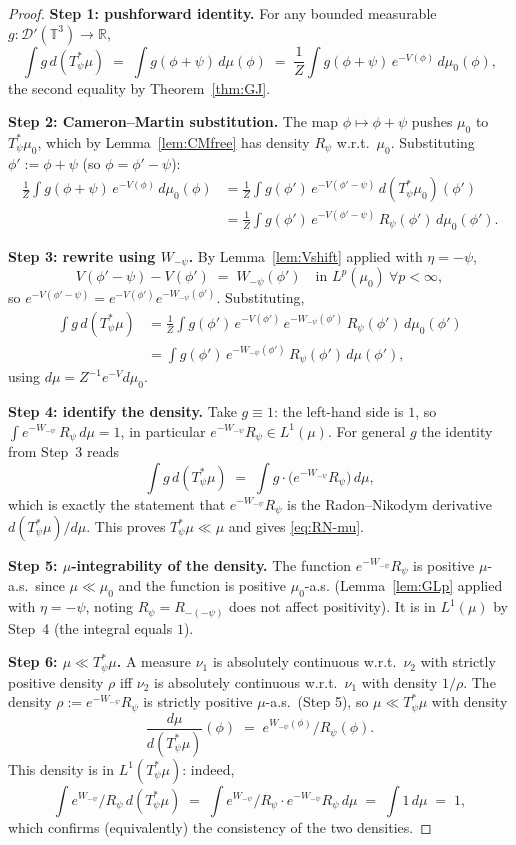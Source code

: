 \documentclass[12pt]{article}
\theoremstyle{definition}
\begin{document}
\begin{proof}
\textbf{Step 1: pushforward identity.}
For any bounded measurable $g:\mathcal{D}'(\mathbb{T}^3)\to\mathbb{R}$,
\[
\int g\,d(T_\psi^*\mu)\;=\;\int g(\phi+\psi)\,d\mu(\phi)
\;=\;\frac{1}{Z}\int g(\phi+\psi)\,e^{-V(\phi)}\,d\mu_0(\phi),
\]
the second equality by Theorem~\ref{thm:GJ}.

\textbf{Step 2: Cameron--Martin substitution.}
The map $\phi\mapsto\phi+\psi$ pushes $\mu_0$ to $T_\psi^*\mu_0$, which by
Lemma~\ref{lem:CMfree} has density $R_\psi$ w.r.t.\ $\mu_0$. Substituting $\phi':=\phi+\psi$
(so $\phi=\phi'-\psi$):
\begin{align*}
\frac{1}{Z}\int g(\phi+\psi)\,e^{-V(\phi)}\,d\mu_0(\phi)
&= \frac{1}{Z}\int g(\phi')\,e^{-V(\phi'-\psi)}\,d(T_\psi^*\mu_0)(\phi')\\
&= \frac{1}{Z}\int g(\phi')\,e^{-V(\phi'-\psi)}\,R_\psi(\phi')\,d\mu_0(\phi').
\end{align*}

\textbf{Step 3: rewrite using $W_{-\psi}$.}
By Lemma~\ref{lem:Vshift} applied with $\eta=-\psi$,
\[
V(\phi'-\psi)-V(\phi') \;=\; W_{-\psi}(\phi')\quad\text{in } L^p(\mu_0)\ \forall p<\infty,
\]
so $e^{-V(\phi'-\psi)}=e^{-V(\phi')}e^{-W_{-\psi}(\phi')}$. Substituting,
\begin{align*}
\int g\,d(T_\psi^*\mu)
&= \frac{1}{Z}\int g(\phi')\,e^{-V(\phi')}\,e^{-W_{-\psi}(\phi')}\,R_\psi(\phi')\,d\mu_0(\phi')\\
&= \int g(\phi')\,e^{-W_{-\psi}(\phi')}\,R_\psi(\phi')\,d\mu(\phi'),
\end{align*}
using $d\mu=Z^{-1}e^{-V}d\mu_0$.

\textbf{Step 4: identify the density.}
Take $g\equiv 1$: the left-hand side is $1$, so
$\int e^{-W_{-\psi}}\,R_\psi\,d\mu=1$, in particular $e^{-W_{-\psi}}R_\psi\in L^1(\mu)$.
For general $g$ the identity from Step~3 reads
\[
\int g\,d(T_\psi^*\mu)\;=\;\int g\cdot \bigl(e^{-W_{-\psi}}R_\psi\bigr)\,d\mu,
\]
which is exactly the statement that $e^{-W_{-\psi}}R_\psi$ is the Radon--Nikodym derivative
$d(T_\psi^*\mu)/d\mu$. This proves $T_\psi^*\mu\ll\mu$ and gives \eqref{eq:RN-mu}.

\textbf{Step 5: $\mu$-integrability of the density.}
The function $e^{-W_{-\psi}}R_\psi$ is positive $\mu$-a.s.\ since $\mu\ll\mu_0$ and the
function is positive $\mu_0$-a.s. (Lemma~\ref{lem:GLp} applied with $\eta=-\psi$, noting
$R_\psi=R_{-(-\psi)}$ does not affect positivity). It is in $L^1(\mu)$ by Step~4 (the
integral equals $1$).

\textbf{Step 6: $\mu\ll T_\psi^*\mu$.}
A measure $\nu_1$ is absolutely continuous w.r.t.\ $\nu_2$ with strictly positive density
$\rho$ iff $\nu_2$ is absolutely continuous w.r.t.\ $\nu_1$ with density $1/\rho$. The
density $\rho:=e^{-W_{-\psi}}R_\psi$ is strictly positive $\mu$-a.s.\ (Step 5), so
$\mu\ll T_\psi^*\mu$ with density
\[
\frac{d\mu}{d(T_\psi^*\mu)}(\phi) \;=\; e^{W_{-\psi}(\phi)}/R_\psi(\phi).
\]
This density is in $L^1(T_\psi^*\mu)$: indeed,
\[
\int e^{W_{-\psi}}/R_\psi\,d(T_\psi^*\mu)
\;=\; \int e^{W_{-\psi}}/R_\psi\cdot e^{-W_{-\psi}}R_\psi\,d\mu
\;=\; \int 1\,d\mu \;=\; 1,
\]
which confirms (equivalently) the consistency of the two densities.


\end{proof}
\end{document}

